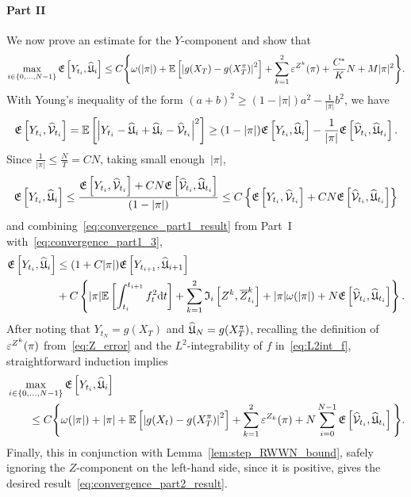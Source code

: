 \paragraph{\textbf{Part II}} 
We now prove an estimate for the $Y$-component and show that
\begin{align}\label{eq:convergence_part2_result}
\max_{i\in\{0,\dots,N-1\}} 
\ErrYiUfi \leq C\Bigg\{\omega(|\pi|) + \EE\left[\left|g(X_T)-g(X^\pi_T)\right|^2\right]+\sum_{k=1}^2\eps^{Z^k}(\pi)+\frac{C^{*}}{K}N + M|\pi|^2\Bigg\}.
\end{align}
With Young's inequality of the form $(a+b)^2\geq (1-|\pi|)a^2 - \frac1{|\pi|} b^2$,
we have
\begin{equation}
\ErrYiVhat = \EE\left[\left|Y_{t_i} - \widehat{\Uf}_i + \widehat{\Uf}_i - \widehat{\Vv}_{t_i}\right|^2\right] 
\geq (1-|\pi|)\ErrYiUfi - \frac1{|\pi|} \ErrVhatiUfi.
\end{equation}
Since $\frac1{|\pi|}\leq \frac{N}{T}=CN$,
taking small enough~$|\pi|$, 
\begin{equation}\label{eq:convergence_part1_3}
\ErrYiUfi \leq \frac{\ErrYiVhat + CN \ErrVhatiUfi}{(1-|\pi|)}
    \leq C \left\{
\ErrYiVhat + CN \ErrVhatiUfi\right\}
\end{equation}
and combining~\eqref{eq:convergence_part1_result} from Part~I with~\eqref{eq:convergence_part1_3},
\begin{align*}
 \ErrYiUfi & \leq (1+C|\pi|) \ErrYiUfip \\
 & + C\left\{|\pi| \EE\left[\int_{t_i}^{t_{i+1}}f_{t}^2 \D t\right] + \sum_{k=1}^{2}\ErrIntZkibar + |\pi|\omega(|\pi|) + N\ErrVhatiUfi
  \right\}.
\end{align*}
After noting that $Y_{t_N}= g(X_T)$ and $\widehat{\Uf}_N= g(X^\pi_T)$, recalling the definition of $\eps^{Z^k}(\pi)$ from~\eqref{eq:Z_error} and the $L^2$-integrability of $f$ in~\eqref{eq:L2int_f}, 
straightforward induction implies
\begin{align*}
&\max_{i\in\{0, \dots, N-1\}}\ErrYiUfi \\
&\qquad\leq C\Bigg\{\omega(|\pi|) + |\pi| + \EE\left[\left|g(X_t)-g(X^\pi_T)\right|^2\right] + \sum_{k=1}^2\eps^{Z_k}(\pi)
 + N\sum_{i=0}^{N-1}\ErrVhatiUfi\Bigg\}.
\end{align*}
Finally, this in conjunction with Lemma~\ref{lem:step_RWWN_bound}, safely ignoring the $Z$-component on the left-hand side, since it is positive, gives the desired result~\eqref{eq:convergence_part2_result}.

